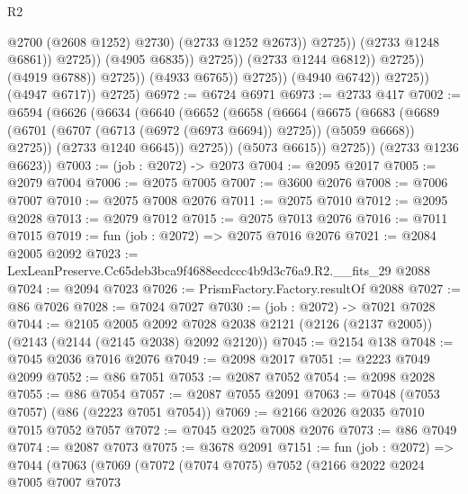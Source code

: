 \begin{lexlean}{R2}
\begin{coremodule}
                                                    @2700
                                                    (@2608 @1252)
                                                    @2730)
                                                  (@2733 @1252 @2673))
                                                @2725))
                                            (@2733 @1248 @6861))
                                          @2725))
                                      (@4905 @6835))
                                    @2725))
                                (@2733 @1244 @6812))
                              @2725))
                          (@4919 @6788))
                        @2725))
                    (@4933 @6765))
                  @2725))
              (@4940 @6742))
            @2725))
        (@4947 @6717))
      @2725)
@6972 := @6724 @6971
@6973 := @2733 @417
@7002 := @6594
    (@6626
      (@6634
        (@6640
          (@6652
            (@6658
              (@6664
                (@6675
                  (@6683
                    (@6689 (@6701 (@6707 (@6713 (@6972 (@6973 @6694)) @2725)) (@5059 @6668)) @2725))
                  (@2733 @1240 @6645))
                @2725))
            (@5073 @6615))
          @2725))
      (@2733 @1236 @6623))
@7003 := (job : @2072) -> @2073
@7004 := @2095 @2017
@7005 := @2079 @7004
@7006 := @2075 @7005
@7007 := @3600 @2076
@7008 := @7006 @7007
@7010 := @2075 @7008 @2076
@7011 := @2075 @7010
@7012 := @2095 @2028
@7013 := @2079 @7012
@7015 := @2075 @7013 @2076
@7016 := @7011 @7015
@7019 := fun (job : @2072) => @2075 @7016 @2076
@7021 := @2084 @2005 @2092
@7023 := LexLeanPreserve.Cc65deb3bca9f4688ecdccc4b9d3c76a9.R2.__fits_29 @2088
@7024 := @2094 @7023
@7026 := PrismFactory.Factory.resultOf @2088
@7027 := @86 @7026
@7028 := @7024 @7027
@7030 := (job : @2072) -> @7021 @7028
@7044 := @2105
    @2005
    @2092
    @7028
    @2038
    @2121
    (@2126 (@2137 @2005))
    (@2143 (@2144 (@2145 @2038) @2092 @2120))
@7045 := @2154 @138
@7048 := @7045 @2036 @7016 @2076
@7049 := @2098 @2017
@7051 := @2223 @7049 @2099
@7052 := @86 @7051
@7053 := @2087 @7052
@7054 := @2098 @2028
@7055 := @86 @7054
@7057 := @2087 @7055 @2091
@7063 := @7048 (@7053 @7057) (@86 (@2223 @7051 @7054))
@7069 := @2166 @2026 @2035 @7010 @7015 @7052 @7057
@7072 := @7045 @2025 @7008 @2076
@7073 := @86 @7049
@7074 := @2087 @7073
@7075 := @3678 @2091
@7151 := fun (job : @2072) =>
  @7044
    (@7063
      (@7069
        (@7072
          (@7074 @7075)
          @7052
          (@2166
            @2022
            @2024
            @7005
            @7007
            @7073

\end{coremodule}
\end{lexlean}
